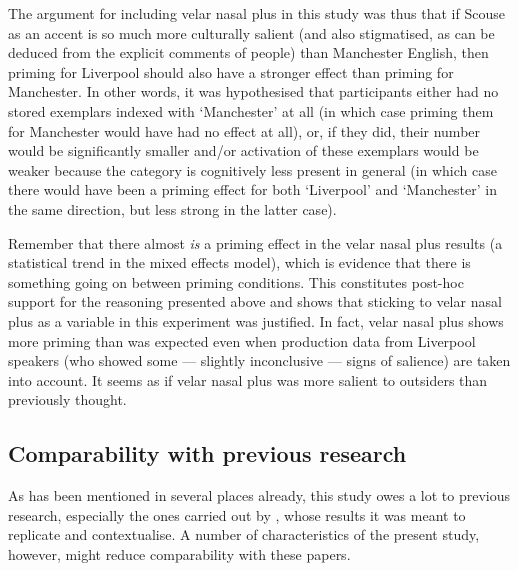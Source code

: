 The argument for including velar nasal plus in this study was thus that if Scouse as an accent is so much more culturally salient (and also stigmatised, as can be deduced from the explicit comments of people) than Manchester English, then priming for Liverpool should also have a stronger effect than priming for Manchester.
In other words, it was hypothesised that participants either had no stored exemplars indexed with `Manchester' at all (in which case priming them for Manchester would have had no effect at all), or, if they did, their number would be significantly smaller and/or activation of these exemplars would be weaker because the category is cognitively less present in general (in which case there would have been a priming effect for both `Liverpool' and `Manchester' in the same direction, but less strong in the latter case).

Remember that there almost \emph{is} a priming effect in the velar nasal plus results (a statistical trend in the mixed effects model), which is evidence that there is something going on between priming conditions.
This constitutes post-hoc support for the reasoning presented above and shows that sticking to velar nasal plus as a variable in this experiment was justified.
In fact, velar nasal plus shows more priming than was expected even when production data from Liverpool speakers (who showed some --- slightly inconclusive --- signs of salience) are taken into account.
It seems as if velar nasal plus was more salient to outsiders than previously thought.

		\subsection{Comparability with previous research}

As has been mentioned in several places already, this study owes a lot to previous research, especially the ones carried out by \textcite{niedzielski1999,hayetal2006a,hayetal2006b,haydrager2010}, whose results it was meant to replicate and contextualise.
A number of characteristics of the present study, however, might reduce comparability with these papers.

